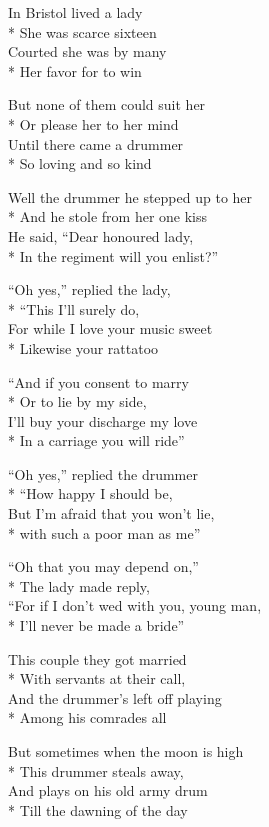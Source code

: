 
\contd
{}

\versemark
In Bristol lived a lady\\*
She was scarce sixteen\\
Courted she was by many\\*
Her favor for to win

\versemark
But none of them could suit her\\*
Or please her to her mind\\
Until there came a drummer\\*
So loving and so kind

\versemark
Well the drummer he stepped up to her\\*
And he stole from her one kiss\\
He said, “Dear honoured lady,\\*
In the regiment will you enlist?”

\versemark
“Oh yes,” replied the lady,\\*
“This I’ll surely do,\\
For while I love your music sweet\\*
Likewise your rattatoo

\versemark
“And if you consent to marry\\*
Or to lie by my side,\\
I’ll buy your discharge my love\\*
In a carriage you will ride”

\versemark
“Oh yes,” replied the drummer\\*
“How happy I should be,\\
But I’m afraid that you won’t lie,\\*
with such a poor man as me”

\versemark
“Oh that you may depend on,”\\*
The lady made reply,\\
“For if I don’t wed with you, young man,\\*
I'll never be made a bride”

\versemark
This couple they got married\\*
With servants at their call,\\
And the drummer’s left off playing\\*
Among his comrades all

\versemark
But sometimes when the moon is high\\*
This drummer steals away,\\
And plays on his old army drum\\*
Till the dawning of the day

